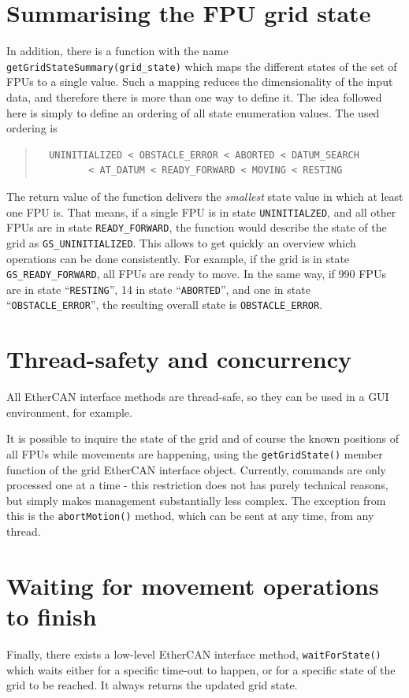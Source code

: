 \documentclass[fontsize=12,a4paper]{scrreprt}
\begin{document}
\section{Summarising the FPU grid state}
In addition, there is a function with the name
\texttt{getGridStateSummary(grid\_state)} which maps the different
states of the set of FPUs to a single value. Such a mapping reduces
the dimensionality of the input data, and therefore there is more than
one way to define it. The idea followed here is simply to define an
ordering of all state enumeration values. The used ordering is
\begin{quote}
\begin{verbatim}
  UNINITIALIZED < OBSTACLE_ERROR < ABORTED < DATUM_SEARCH
         < AT_DATUM < READY_FORWARD < MOVING < RESTING
\end{verbatim}
\end{quote}

The return value of the function delivers the \emph{smallest} state
value in which at least one FPU is.  That means, if a single FPU is in
state \texttt{UNINITIALZED}, and all other FPUs are in state
\texttt{READY\_FORWARD}, the function would describe the state of the
grid as \texttt{GS\_UNINITIALIZED}. This allows to get quickly an
overview which operations can be done consistently. For example, if
the grid is in state \texttt{GS\_READY\_FORWARD}, all FPUs are ready
to move. In the same way, if 990 FPUs are in state ``\texttt{RESTING}'',
14 in state ``\texttt{ABORTED}'', and one in state ``\texttt{OBSTACLE\_ERROR}'',
the resulting overall state is \texttt{OBSTACLE\_ERROR}.


\section{Thread-safety and concurrency}
All EtherCAN interface methods are thread-safe, so they can be used in a GUI
environment, for example.

It is possible to inquire the state of the grid and of course the
known positions of all FPUs while movements are happening, using the
\texttt{getGridState()} member function of the grid EtherCAN interface
object. Currently, commands are only processed one at a time - this
restriction does not has purely technical reasons, but simply makes
management substantially less complex. The exception from this is the
\texttt{abortMotion()} method, which can be sent at any time, from any
thread.

\section{Waiting for movement operations to finish}
Finally, there exists a low-level EtherCAN interface method,
\texttt{waitForState()} which waits either for a specific time-out to
happen, or for a specific state of the grid to be reached. It always
returns the updated grid state.
\end{document}
